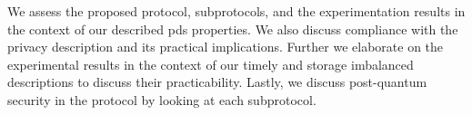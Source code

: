 We assess the proposed protocol, subprotocols, and the experimentation results in the context of our described \acrshort{pds} properties. We also discuss compliance with the privacy description and its practical implications. Further we elaborate on the experimental results in the context of our timely and storage imbalanced descriptions to discuss their practicability. Lastly, we discuss post-quantum security in the protocol by looking at each subprotocol.
